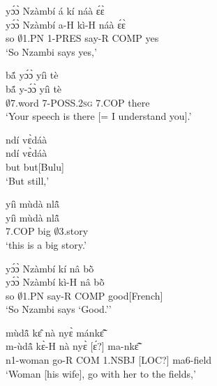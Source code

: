 \begin{exe} 
\exN\label{46}
  \glll  yɔ́ɔ̀ Nzàmbí á kí náà ɛ́ɛ̀ \\
         yɔ́ɔ̀ Nzàmbí a-H kì-H náà ɛ́ɛ̀ \\
          so $\emptyset$1.PN 1-PRES say-R COMP yes \\
    \trans `So Nzambi says yes,'
\end{exe}

\begin{exe} 
\exN\label{47}
  \glll bã́ yɔ́ɔ̀ yíì tè \\
        bã́ y-ɔ́ɔ̀ yíì tè \\
         $\emptyset$7.word 7-POSS.2\textsc{sg}  7.COP there \\
    \trans `Your speech is there [= I understand you].'
\end{exe}

\begin{exe} 
\exN\label{48} 
  \glll  ndí vɛ̀dáà \\
         ndí vɛ̀dáà \\
          but but[Bulu]  \\
    \trans `But still,'
\end{exe}

\begin{exe} 
\exN\label{49} 
  \glll  yíì mùdà nlã̂ \\
        yíì mùdà nlã̂ \\
          7.COP big $\emptyset$3.story \\
    \trans `this is a big story.'
\end{exe}

\begin{exe} 
\exN\label{50}
  \glll yɔ́ɔ̀ Nzàmbí kí nâ bõ̀  \\
        yɔ́ɔ̀ Nzàmbí kì-H nâ bõ̀  \\
          so $\emptyset$1.PN say-R COMP good[French] \\
    \trans `So Nzambi says `Good.''
\end{exe}

\begin{exe} 
\exN\label{51}
  \glll mùdã̂ kɛ̂ nà nyɛ̀ mánkɛ̃̂ \\
       m-ùdã̂ kɛ̀-H nà nyɛ̀ [ɛ́?] ma-nkɛ̃̂ \\
         n1-woman go-R COM 1.NSBJ [LOC?] ma6-field  \\
    \trans `Woman [his wife], go with her to the fields,'
\end{exe}

